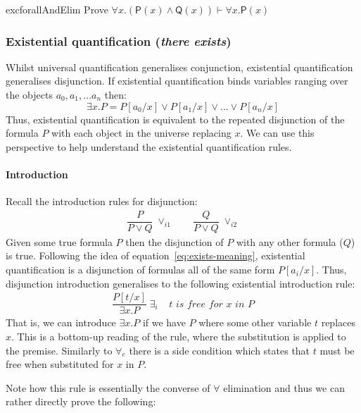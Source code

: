 \documentclass{article}
\theoremstyle{definition}
\newcommand{\rel}[1]{\mathsf{#1}}
\begin{document}
\begin{restatable}{exc}{forallAndElim}
  Prove $\forall x . (\rel{P}(x) \wedge \rel{Q}(x)) \vdash \forall x . \rel{P}(x)$
\end{restatable}

\subsubsection{Existential quantification (\emph{there exists})}

Whilst universal quantification generalises conjunction,
existential quantification generalises disjunction. 
If existential quantification binds variables ranging
over the objects $a_0, a_1, \ldots a_n$ then:
%
\begin{equation}
\exists x . P = P[a_0/x] \vee P[a_1/x] \vee
\ldots \vee P[a_{n}/x]
\label{eq:exists-meaning}
\end{equation}
%
Thus, existential quantification is equivalent to the repeated
disjunction of the formula $P$ with each object in the universe
replacing $x$. We can use this perspective to help understand the
existential quantification rules.

\paragraph{Introduction} Recall the introduction rules for disjunction:
%
\begin{align*}
    \dfrac{P}
  {P \vee Q} \; {\vee_{i1}}
  \qquad
    \dfrac{Q}
  {P \vee Q} \; {\vee_{i2}}
\end{align*}
%
Given some true formula $P$ then the disjunction of $P$ with any other
formula ($Q$) is true. Following the idea of
equation~\eqref{eq:exists-meaning}, existential quantification is a
disjunction of formulas all of the same form $P[a_i/x]$.  Thus,
disjunction introduction generalises to the following existential
introduction rule:
%
\begin{align*}
\dfrac{P[t/x]}{\exists x . P} \; \exists_i \;\;\;\;
\textit{$t$ is free for $x$ in $P$}
\end{align*}
%
That is, we can introduce $\exists x . P$ if we have
$P$ where some other variable $t$ replaces $x$. This
is a bottom-up reading of the rule, where the substitution
is applied to the premise. Similarly to $\forall_e$ there is a
side condition which states that $t$ must be free when substituted
for $x$ in $P$.

Note how this rule is essentially
the converse of $\forall$ elimination and thus we can
rather directly prove the following:
\end{document}
